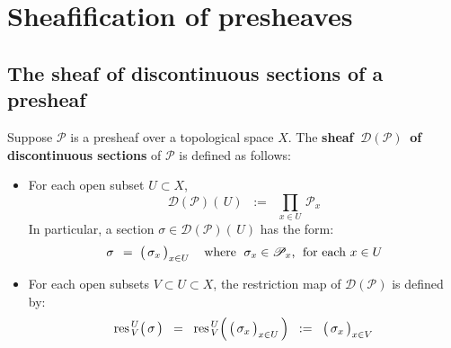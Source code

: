 

\section{Sheafification of presheaves}


\renewcommand{\theenumi}{\roman{enumi}}
\renewcommand{\labelenumi}{\textnormal{(\theenumi)}$\;\;$}


\subsection{The sheaf of discontinuous sections of a presheaf}
\setcounter{theorem}{0}
\setcounter{equation}{0}

\begin{definition}
\mbox{}\vskip 0.1cm
\noindent
Suppose $\mathscr{P}$ is a presheaf over a topological space $X$.
\vskip 0.1cm
\noindent
The \textbf{sheaf \,$\mathscr{D}(\mathscr{P})$\, of discontinuous sections} of $\mathscr{P}$
is defined as follows:
\begin{itemize}
\item
	For each open subset $U \subset X$,
	\begin{equation*}
	\mathscr{D}(\mathscr{P})(\,U)
	\;\; := \;\;
		\underset{x \in U}{\prod} \, \mathscr{P}_{x}
	\end{equation*}
	In particular, a section $\sigma \in \mathscr{D}(\mathscr{P})(\,U)$ has the form:
	\begin{equation*}
	\sigma
	\;\, = \;
		\left(\,\overset{{\color{white}.}}{\sigma_{x}}\,\right)_{x \in U}
	\quad
	\textnormal{where \;$\sigma_{x} \in \mathscr{P}_{x}$,\; for each $x \in U$}
	\end{equation*}
\item
	For each open subsets $V \subset U \subset X$,
	the restriction map of $\mathscr{D}(\mathscr{P})$ is defined by:
	\begin{equation*}
	\res^{\,U}_{\,V}\!\left(\,\overset{{\color{white}.}}{\sigma}\,\right)
	\;\; = \;\;
		\res^{\,U}_{\,V}\!\left(\,\left(\,\overset{{\color{white}.}}{\sigma_{x}}\,\right)_{x \in U}\,\right)
	\;\; := \;\;
		\left(\,\overset{{\color{white}.}}{\sigma_{x}}\,\right)_{x \in V}
	\end{equation*}
\end{itemize}
\end{definition}

